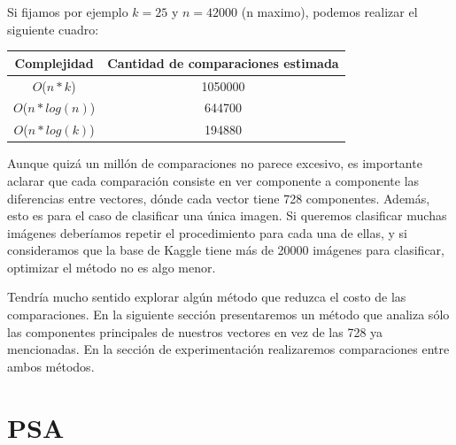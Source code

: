 Si fijamos por ejemplo $k = 25$ y $n = 42000$ (n maximo), podemos realizar el siguiente cuadro:

\begin{center}
    \begin{tabular}{| c | c |}
    \hline
    Complejidad   &  Cantidad de comparaciones estimada \\ \hline

    $O$($n * k$)            & 1050000  \\ \hline
    $O$($n * log(n)$)       & 644700  \\ \hline
    $O$($n * log(k)$)       & 194880   \\ \hline
    \end{tabular}
\end{center}

Aunque quizá un millón de comparaciones no parece excesivo, es importante aclarar que cada comparación consiste en ver componente a componente las diferencias entre vectores, dónde cada vector tiene 728 componentes. Además, esto es para el caso de clasificar una única imagen. Si queremos clasificar muchas imágenes deberíamos repetir el procedimiento para cada una de ellas, y si consideramos que la base de Kaggle tiene más de 20000 imágenes para clasificar, optimizar el método no es algo menor. \\



Tendría mucho sentido explorar algún método que reduzca el costo de las comparaciones. En la siguiente sección presentaremos un método que analiza sólo las componentes principales de nuestros vectores en vez de las 728 ya mencionadas. En la sección de experimentación realizaremos comparaciones entre ambos métodos. \\


\section{PSA}








